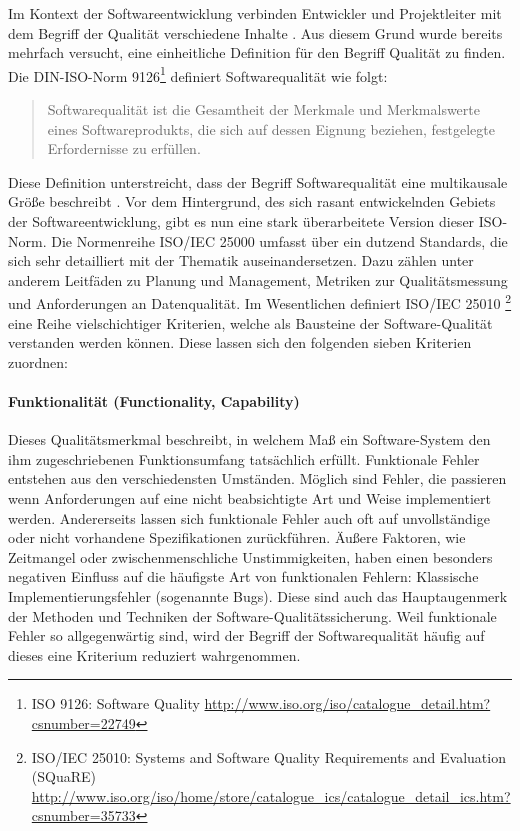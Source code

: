Im Kontext der Softwareentwicklung verbinden Entwickler und Projektleiter mit dem Begriff der Qualität verschiedene Inhalte \cite{hoffmann_software-qualitat_2013}. Aus diesem Grund wurde bereits mehrfach versucht, eine einheitliche Definition für den Begriff Qualität zu finden. Die DIN-ISO-Norm 9126\footnote{ISO 9126: Software Quality \url{http://www.iso.org/iso/catalogue_detail.htm?csnumber=22749}} definiert Softwarequalität wie folgt:

\begin{quote}
Softwarequalität ist die Gesamtheit der Merkmale und Merkmalswerte eines Softwareprodukts, die sich auf dessen Eignung beziehen, festgelegte Erfordernisse zu erfüllen.
\end{quote}

Diese Definition unterstreicht, dass der Begriff Softwarequalität eine multikausale Größe beschreibt \cite{hoffmann_software-qualitat_2013}. Vor dem Hintergrund, des sich rasant entwickelnden Gebiets der Softwareentwicklung, gibt es nun eine stark überarbeitete Version dieser ISO-Norm. Die Normenreihe ISO/IEC 25000 umfasst über ein dutzend Standards, die sich sehr detailliert mit der Thematik auseinandersetzen. Dazu zählen unter anderem Leitfäden zu Planung und Management, Metriken zur Qualitätsmessung und Anforderungen an Datenqualität. Im Wesentlichen definiert ISO/IEC 25010 \footnote{ISO/IEC 25010: Systems and Software Quality Requirements and Evaluation (SQuaRE) \url{http://www.iso.org/iso/home/store/catalogue_ics/catalogue_detail_ics.htm?csnumber=35733}} eine Reihe vielschichtiger Kriterien, welche als Bausteine der Software-Qualität verstanden werden können. Diese lassen sich den folgenden sieben Kriterien zuordnen:

\paragraph{Funktionalität (Functionality, Capability)} Dieses Qualitätsmerkmal beschreibt, in welchem Maß ein Software-System den ihm zugeschriebenen Funktionsumfang tatsächlich erfüllt. Funktionale Fehler entstehen aus den verschiedensten Umständen. Möglich sind Fehler, die passieren wenn Anforderungen auf eine nicht beabsichtigte Art und Weise implementiert werden. Andererseits lassen sich funktionale Fehler auch oft auf unvollständige oder nicht vorhandene Spezifikationen zurückführen. Äußere Faktoren, wie Zeitmangel oder zwischenmenschliche Unstimmigkeiten, haben einen besonders negativen Einfluss auf die häufigste Art von funktionalen Fehlern: Klassische Implementierungsfehler (sogenannte \Glspl{Bug}). Diese sind auch das Hauptaugenmerk der Methoden und Techniken der Software-Qualitätssicherung. Weil funktionale Fehler so allgegenwärtig sind, wird der Begriff der Softwarequalität häufig auf dieses eine Kriterium reduziert wahrgenommen.


